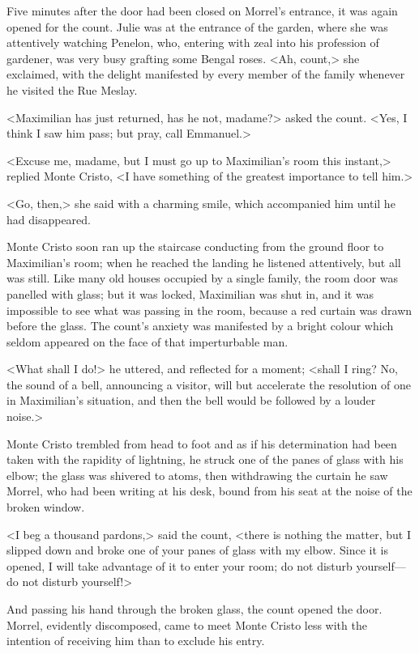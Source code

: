  Five minutes after the door had been closed on Morrel's entrance, it was again opened for the count. Julie was at the entrance of the garden, where she was attentively watching Penelon, who, entering with zeal into his profession of gardener, was very busy grafting some Bengal roses. <Ah, count,> she exclaimed, with the delight manifested by every member of the family whenever he visited the Rue Meslay. 

 <Maximilian has just returned, has he not, madame?> asked the count.  <Yes, I think I saw him pass; but pray, call Emmanuel.> 

 <Excuse me, madame, but I must go up to Maximilian's room this instant,> replied Monte Cristo, <I have something of the greatest importance to tell him.> 

 <Go, then,> she said with a charming smile, which accompanied him until he had disappeared. 

 Monte Cristo soon ran up the staircase conducting from the ground floor to Maximilian's room; when he reached the landing he listened attentively, but all was still. Like many old houses occupied by a single family, the room door was panelled with glass; but it was locked, Maximilian was shut in, and it was impossible to see what was passing in the room, because a red curtain was drawn before the glass. The count's anxiety was manifested by a bright colour which seldom appeared on the face of that imperturbable man. 

 <What shall I do!> he uttered, and reflected for a moment; <shall I ring? No, the sound of a bell, announcing a visitor, will but accelerate the resolution of one in Maximilian's situation, and then the bell would be followed by a louder noise.> 

 Monte Cristo trembled from head to foot and as if his determination had been taken with the rapidity of lightning, he struck one of the panes of glass with his elbow; the glass was shivered to atoms, then withdrawing the curtain he saw Morrel, who had been writing at his desk, bound from his seat at the noise of the broken window. 

 <I beg a thousand pardons,> said the count, <there is nothing the matter, but I slipped down and broke one of your panes of glass with my elbow. Since it is opened, I will take advantage of it to enter your room; do not disturb yourself—do not disturb yourself!> 

 And passing his hand through the broken glass, the count opened the door. Morrel, evidently discomposed, came to meet Monte Cristo less with the intention of receiving him than to exclude his entry. 

